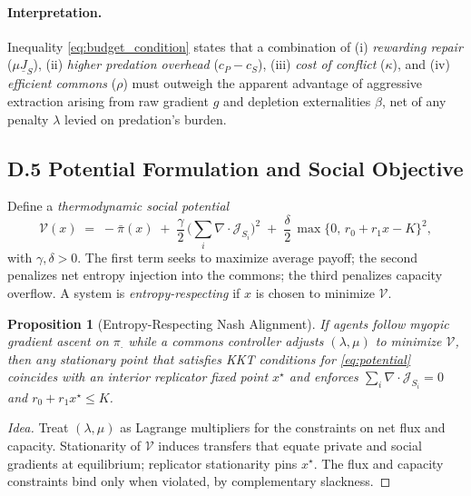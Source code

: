 \documentclass[11pt,a4paper,titlepage]{article}
\newtheorem{proposition}[theorem]{Proposition}
\theoremstyle{definition}
\begin{document}
\paragraph{Interpretation.}
Inequality \eqref{eq:budget_condition} states that a combination of (i) \emph{rewarding repair} ($\mu\underline{J}_S$), (ii) \emph{higher predation overhead} ($c_P-c_S$), (iii) \emph{cost of conflict} ($\kappa$), and (iv) \emph{efficient commons} ($\rho$) must outweigh the apparent advantage of aggressive extraction arising from raw gradient $g$ and depletion externalities $\beta$, net of any penalty $\lambda$ levied on predation’s burden.

\subsection*{D.5 Potential Formulation and Social Objective}

Define a \emph{thermodynamic social potential}
\begin{equation}
\mathcal{V}(x)
\;=\;
-\bar{\pi}(x)
\;+\;
\frac{\gamma}{2}\,\Big(\sum_i \nabla\cdot \mathcal{J}_{S_i}\Big)^2
\;+\;
\frac{\delta}{2}\,\max\{0,\,r_0+r_1x - K\}^2,
\label{eq:potential}
\end{equation}
with $\gamma,\delta>0$. The first term seeks to maximize average payoff; the second penalizes net entropy injection into the commons; the third penalizes capacity overflow. A system is \emph{entropy-respecting} if $x$ is chosen to minimize $\mathcal{V}$.

\begin{proposition}[Entropy-Respecting Nash Alignment]
If agents follow myopic gradient ascent on $\pi_{\cdot}$ while a commons controller adjusts $(\lambda,\mu)$ to minimize $\mathcal{V}$, then any stationary point that satisfies KKT conditions for \eqref{eq:potential} coincides with an interior replicator fixed point $x^\star$ and enforces
\(
\sum_i \nabla\cdot \mathcal{J}_{S_i} = 0
\)
and $r_0+r_1x^\star \le K$.
\end{proposition}

\begin{proof}[Idea]
Treat $(\lambda,\mu)$ as Lagrange multipliers for the constraints on net flux and capacity. Stationarity of $\mathcal{V}$ induces transfers that equate private and social gradients at equilibrium; replicator stationarity pins $x^\star$. The flux and capacity constraints bind only when violated, by complementary slackness.
\end{proof}
\end{document}
